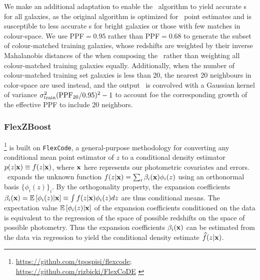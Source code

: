 We make an additional adaptation to enable the \cmnn\ algorithm to yield accurate \pzpdf s for all galaxies, as the original \citet{Graham:17} algorithm is optimized for \pz\ point estimates and is susceptible to less accurate \pzpdf s for bright galaxies or those with few matches in colour-space.
We use PPF$=0.95$ rather than PPF$=0.68$ to generate the subset of colour-matched training galaxies, whose redshifts are weighted by their inverse Mahalanobis distances of the when composing the \pzpdf\ rather than weighting all colour-matched training galaxies equally.
Additionally, when the number of colour-matched training set galaxies is less than 20, the nearest 20 neighbours in color-space are used instead, and the output \pzpdf\ is convolved with a Gaussian kernel of variance $\sigma_{\rm train}^{2}({\rm PPF}_{20}/0.95)^2 -1$ to account foe the corresponding growth of the effective PPF to include 20 neighbors.

\subsubsection{FlexZBoost}
\label{sec:flexzboost}

\flexzboost \footnote{\url{https://github.com/tpospisi/flexcode};\\ \url{https://github.com/rizbicki/FlexCoDE} \label{flexzboost_github}} \citep{Izbicki:17} is built on \texttt{FlexCode}, a general-purpose methodology for converting any conditional mean point estimator of $z$ to a conditional density estimator $p(z \vert {\mathbf{x}}) \equiv f(z \vert {\mathbf{x}})$, where ${\mathbf{x}}$ here represents our photometric covariates and errors.
\flexzboost\ expands the unknown function $f(z \vert {\mathbf{x}}) = \sum_{i}\beta_{i}({\mathbf{x}})\phi_{i}(z)$ using an orthonormal basis $\{\phi_{i}(z)\}_{i}$.
By the orthogonality property, the expansion coefficients $\beta_{i}({\mathbf{x}}) = \mathbb{E}\left[\phi_i(z)|{\mathbf{x}}\right] \equiv \int f(z \vert {\mathbf{x}}) \phi_{i}(z) dz$ are thus conditional means.
The expectation value $\mathbb{E}\left[\phi_i(z) \vert {\mathbf{x}}\right]$ of the expansion coefficients conditioned on the data is equivalent to the regression of the space of possible redshifts on the space of possible photometry.
Thus the expansion coefficients $\beta_{i}({\mathbf{x}})$ can be estimated from the data via regression to yield the conditional density estimate $\widehat{f}(z \vert {\mathbf{x}})$.

